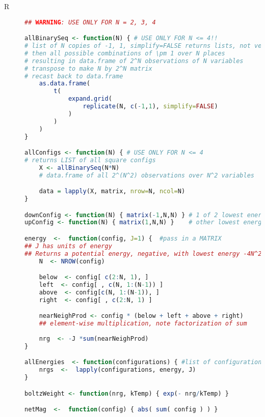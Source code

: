 
\begin{description}



\item[R] 


\begin{lstlisting}[language=R]
## WARNING: USE ONLY FOR N = 2, 3, 4

allBinarySeq <- function(N) { # USE ONLY FOR N <= 4!!
# list of N copies of -1, 1, simplify=FALSE returns lists, not vectors
# then all possible combinations of \pm 1 over N places
# resulting in data.frame of 2^N observations of N variables
# transpose to make N by 2^N matrix
# recast back to data.frame    
    as.data.frame(
        t(
            expand.grid(
                replicate(N, c(-1,1), simplify=FALSE)
            )
        )
    )
}

allConfigs <- function(N) { # USE ONLY FOR N <= 4
# returns LIST of all square configs
    X <- allBinarySeq(N*N)
    # data.frame of all 2^(N^2) observations over N^2 variables

    data = lapply(X, matrix, nrow=N, ncol=N)
}

downConfig <- function(N) { matrix(-1,N,N) } # 1 of 2 lowest energy configs
upConfig <- function(N) { matrix(1,N,N) }    # other lowest energy configs

energy  <-  function(config, J=1) {  #pass in a MATRIX
## J has units of energy
## Returns a potential energy, negative, with lowest energy -4N^2    
    N  <- NROW(config)

    below  <- config[ c(2:N, 1), ]
    left  <- config[ , c(N, 1:(N-1)) ]
    above  <- config[c(N, 1:(N-1)), ]
    right  <- config[ , c(2:N, 1) ]

    nearNeighProd <- config * (below + left + above + right)
    ## element-wise multiplication, note factorization of sum
    
    nrg  <- -J *sum(nearNeighProd)
}

allEnergies  <- function(configurations) { #list of configurations
    nrgs  <-  lapply(configurations, energy, J)
}

boltzWeight <- function(nrg, kTemp) { exp(- nrg/kTemp) }

netMag  <-  function(config) { abs( sum( config ) ) }


\end{lstlisting}
\end{description}
